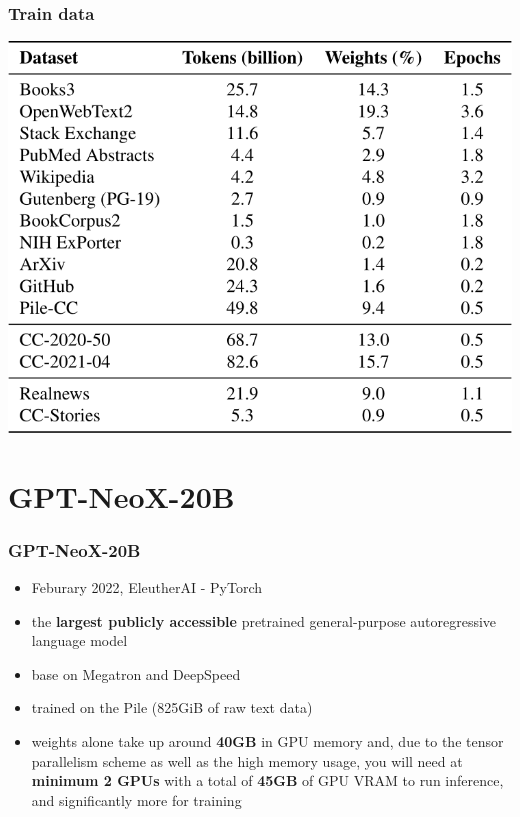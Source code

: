 \documentclass{beamer}
\begin{document}
\begin{frame}
    \frametitle{Train data}
    \begin{center}
        \includegraphics[scale=1.4]{img/mt_nlg_train_data.png}
    \end{center}
\end{frame}



\section{GPT-NeoX-20B}
\begin{frame}
    \frametitle{GPT-NeoX-20B \cite{gpt_neox} \cite{blog_gpt_neox_20b}}
    \begin{itemize}
        \item Feburary 2022, EleutherAI - PyTorch
        \item the \textbf{largest publicly accessible} pretrained general-purpose autoregressive language model
        \item base on Megatron and DeepSpeed
        \item trained on the Pile (825GiB of raw text data)
        \item weights alone take up around \textbf{40GB} in GPU memory and, due to the tensor parallelism scheme as well as the high memory usage, you will need at \textbf{minimum 2 GPUs} with a total of \textbf{45GB} of GPU VRAM to run inference, and significantly more for training
    \end{itemize}
\end{frame}
\end{document}

